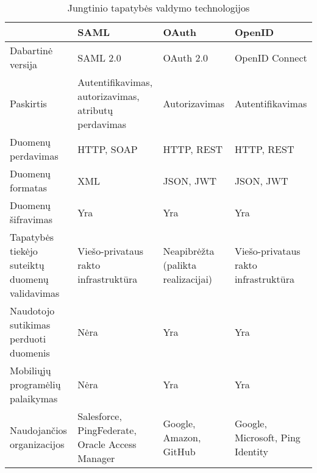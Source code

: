 \begin{table}[htbp]
  \centering
  \caption{Jungtinio tapatybės valdymo technologijos}
    \begin{tabular}{|p{10.22em}|p{10.11em}|p{7.945em}|p{8.78em}|}
    \hline
    \multicolumn{1}{|r|}{} & \textbf{SAML} & \textbf{OAuth} & \textbf{OpenID} \bigstrut\\
    \hline
    Dabartinė versija & SAML 2.0 & OAuth 2.0 & OpenID Connect \bigstrut\\
    \hline
    Paskirtis & Autentifikavimas, autorizavimas, atributų perdavimas & Autorizavimas & Autentifikavimas \bigstrut\\
    \hline
    Duomenų perdavimas & HTTP, SOAP & HTTP, REST & HTTP, REST \bigstrut\\
    \hline
    Duomenų formatas & XML   & JSON, JWT & JSON, JWT \bigstrut\\
    \hline
    Duomenų šifravimas & Yra   & Yra   & Yra \bigstrut\\
    \hline
    Tapatybės tiekėjo suteiktų duomenų validavimas & Viešo-privataus rakto infrastruktūra & Neapibrėžta (palikta realizacijai) & Viešo-privataus rakto infrastruktūra \bigstrut\\
    \hline
    Naudotojo sutikimas perduoti duomenis & Nėra  & Yra   & Yra \bigstrut\\
    \hline
    Mobiliųjų programėlių palaikymas & Nėra  & Yra   & Yra \bigstrut\\
    \hline
    Naudojančios organizacijos & Salesforce, PingFederate, Oracle Access Manager & Google, Amazon, GitHub & Google, Microsoft, Ping Identity \bigstrut\\
    \hline
    \end{tabular}%
  \label{tab:SSOProtocols}%
\end{table}%


